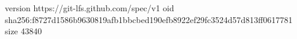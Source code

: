 version https://git-lfs.github.com/spec/v1
oid sha256:f8727d1586b9630819afb1bbcbed190efb8922ef29fc3524d57d813ff0617781
size 43840
